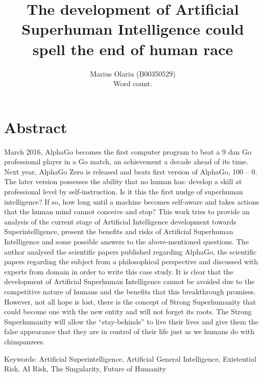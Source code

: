 \documentclass[11pt]{article}
\begin{document}
	\title{The development of Artificial Superhuman Intelligence could spell the end of human race}
	\author{Marius Olariu (B00350529)\\ Word count: }
	\date{}
	\maketitle

\section*{Abstract}
	    March 2016, AlphaGo becomes the first computer program to beat a 9 dan Go professional player in a Go match, an achievement a decade ahead of its time. Next year, AlphaGo Zero is released and beats first version of AlphaGo, 100 – 0. The later version possesses the ability that no human has: develop a skill at professional level by self-instruction. Is it this the first nudge of superhuman intelligence? If so, how long until a machine becomes self-aware and takes actions that the human mind cannot conceive and stop?
    This work tries to provide an analysis of the current stage of Artificial Intelligence development towards Superintelligence, present the benefits and risks of Artificial Superhuman Intelligence and some possible answers to the above-mentioned questions. The author analysed the scientific papers published regarding AlphaGo, the scientific papers regarding the subject from a philosophical perspective and discussed with experts from domain in order to write this case study.
    It is clear that the development of Artificial Superhuman Intelligence cannot be avoided due to the competitive nature of humans and the benefits that this breakthrough promises. However, not all hope is lost, there is the concept of Strong Superhumanity that could become one with the new entity and will not forget its roots. The Strong Superhumanity will allow the “stay-behinds” to live their lives and give them the false appearance that they are in control of their life just as we humans do with chimpanzees.


Keywords: Artificial Superintelligence, Artificial General Intelligence, Existential Risk, AI Risk, The Singularity, Future of Humanity
\end{document}
